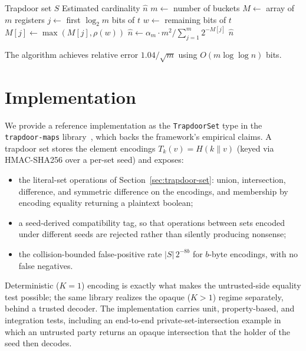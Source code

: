\documentclass[10pt,conference]{IEEEtran}
\begin{document}
\begin{algorithm}
\caption{Cardinality Estimation}
\label{alg:cardinality}
\begin{algorithmic}[1]
\REQUIRE Trapdoor set $S$
\ENSURE Estimated cardinality $\hat{n}$
\STATE $m \leftarrow$ number of buckets
\STATE $M \leftarrow$ array of $m$ registers
  \STATE $j \leftarrow$ first $\log_2 m$ bits of $t$
  \STATE $w \leftarrow$ remaining bits of $t$
  \STATE $M[j] \leftarrow \max(M[j], \rho(w))$
\ENDFOR
\STATE $\hat{n} \leftarrow \alpha_m \cdot m^2 / \sum_{j=1}^{m} 2^{-M[j]}$
\RETURN $\hat{n}$
\end{algorithmic}
\end{algorithm}

The algorithm achieves relative error $1.04/\sqrt{m}$ using $O(m \log \log n)$ bits.

\section{Implementation}
\label{sec:implementation}

We provide a reference implementation as the \texttt{TrapdoorSet} type in the \texttt{trapdoor-maps} library~\cite{trapdoor-computing}, which backs the framework's empirical claims. A trapdoor set stores the element encodings $T_k(v) = H(k \| v)$ (keyed via HMAC-SHA256 over a per-set seed) and exposes:
\begin{itemize}
\item the literal-set operations of Section~\ref{sec:trapdoor-set}: union, intersection, difference, and symmetric difference on the encodings, and membership by encoding equality returning a plaintext boolean;
\item a seed-derived compatibility tag, so that operations between sets encoded under different seeds are rejected rather than silently producing nonsense;
\item the collision-bounded false-positive rate $|S|\,2^{-8b}$ for $b$-byte encodings, with no false negatives.
\end{itemize}
Deterministic ($K = 1$) encoding is exactly what makes the untrusted-side equality test possible; the same library realizes the opaque ($K > 1$) regime separately, behind a trusted decoder. The implementation carries unit, property-based, and integration tests, including an end-to-end private-set-intersection example in which an untrusted party returns an opaque intersection that the holder of the seed then decodes.
\end{document}
